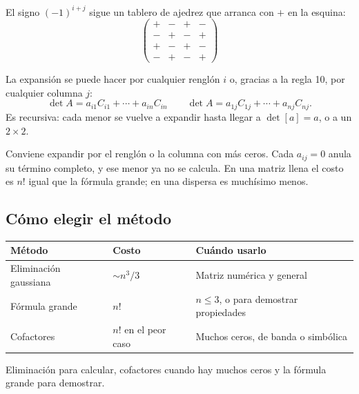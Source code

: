 \documentclass[11pt,letterpaper]{article}
\begin{document}
El signo $(-1)^{i+j}$ sigue un tablero de ajedrez que arranca con $+$
en la esquina:
\[
    \begin{pmatrix}
        + & - & + & - \\
        - & + & - & + \\
        + & - & + & - \\
        - & + & - & +
    \end{pmatrix}
\]

La expansión se puede hacer por cualquier renglón $i$ o, gracias a la
regla 10, por cualquier columna $j$:
\[
    \det A = a_{i1}C_{i1} + \cdots + a_{in}C_{in}
    \qquad
    \det A = a_{1j}C_{1j} + \cdots + a_{nj}C_{nj} .
\]
Es recursiva: cada menor se vuelve a expandir hasta llegar a
$\det[a] = a$, o a un $2 \times 2$.

\begin{idea}
    Conviene expandir por el renglón o la columna con más ceros. Cada
    $a_{ij} = 0$ anula su término completo, y ese menor ya no se
    calcula. En una matriz llena el costo es $n!$ igual que la fórmula
    grande; en una dispersa es muchísimo menos.
\end{idea}


\subsection*{Cómo elegir el método}

\begin{center}
\begin{tabular}{lll}
    \toprule
    \textbf{Método} & \textbf{Costo} & \textbf{Cuándo usarlo} \\
    \midrule
    Eliminación gaussiana & $\sim n^3/3$
        & Matriz numérica y general \\
    Fórmula grande        & $n!$
        & $n \leq 3$, o para demostrar propiedades \\
    Cofactores            & $n!$ en el peor caso
        & Muchos ceros, de banda o simbólica \\
    \bottomrule
\end{tabular}
\end{center}

Eliminación para calcular, cofactores cuando hay muchos ceros y la
fórmula grande para demostrar.

\end{document}
